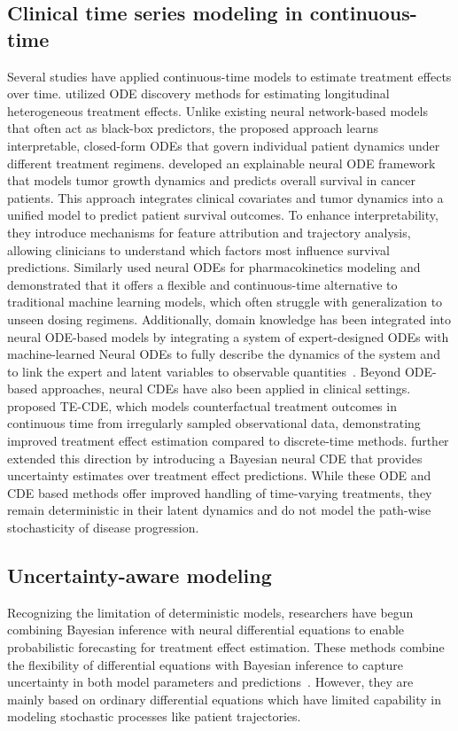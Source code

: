 \documentclass[preprint,12pt]{elsarticle}
\begin{document}
\subsection{Clinical time series modeling in continuous-time}
Several studies have applied continuous-time models to estimate treatment effects over time. \citet{kacprzyk2024ode} utilized ODE discovery methods for estimating longitudinal heterogeneous treatment effects. Unlike existing neural network-based models that often act as black-box predictors, the proposed approach learns interpretable, closed-form ODEs that govern individual patient dynamics under different treatment regimens.
\citet{laurie2023explainable} developed an explainable neural ODE framework that models tumor growth dynamics and predicts overall survival in cancer patients. This approach integrates clinical covariates and tumor dynamics into a unified model to predict patient survival outcomes. To enhance interpretability, they introduce mechanisms for feature attribution and trajectory analysis, allowing clinicians to understand which factors most influence survival predictions. Similarly \citet{lu2021neural} used neural ODEs for pharmacokinetics modeling and demonstrated that it offers a flexible and continuous-time alternative to traditional machine learning models, which often struggle with generalization to unseen dosing regimens. Additionally, domain knowledge has been integrated into neural ODE-based models by integrating a system of expert-designed ODEs with machine-learned Neural ODEs to fully describe the dynamics of the system and to link the expert and latent variables to observable quantities~\citep{qian2021integrating}. Beyond ODE-based approaches, neural CDEs have also been applied in clinical settings. \citet{seedat2022continuous} proposed TE-CDE, which models counterfactual treatment outcomes in continuous time from irregularly sampled observational data, demonstrating improved treatment effect estimation compared to discrete-time methods. \citet{hess2023bayesian} further extended this direction by introducing a Bayesian neural CDE that provides uncertainty estimates over treatment effect predictions. 
While these ODE and CDE based methods offer improved handling of time-varying treatments, they remain deterministic in their latent dynamics and do not model the path-wise stochasticity of disease progression.
\subsection{Uncertainty-aware modeling}
Recognizing the limitation of deterministic models, researchers have begun combining Bayesian inference with neural differential equations to enable probabilistic forecasting for treatment effect estimation. These methods combine the flexibility of differential equations with Bayesian inference to capture uncertainty in both model parameters and predictions~\citep{hess2023bayesian,de2022predicting}. However, they are mainly based on ordinary differential equations which have limited capability in modeling stochastic processes like patient trajectories. 
\end{document}
